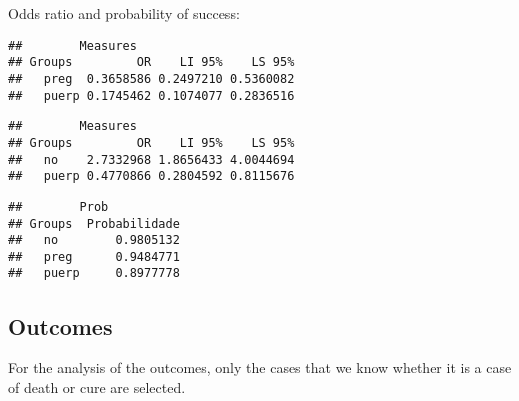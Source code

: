\documentclass[
]{article}
\newenvironment{Shaded}{\begin{snugshade}}{\end{snugshade}}
\newcommand{\CommentTok}[1]{\textcolor[rgb]{0.56,0.35,0.01}{\textit{#1}}}
\newcommand{\KeywordTok}[1]{\textcolor[rgb]{0.13,0.29,0.53}{\textbf{#1}}}
\newcommand{\NormalTok}[1]{#1}
\newcommand{\OperatorTok}[1]{\textcolor[rgb]{0.81,0.36,0.00}{\textbf{#1}}}
\begin{document}
Odds ratio and probability of success:

\begin{Shaded}
\end{Shaded}

\begin{verbatim}
##        Measures
## Groups         OR    LI 95%    LS 95%
##   preg  0.3658586 0.2497210 0.5360082
##   puerp 0.1745462 0.1074077 0.2836516
\end{verbatim}

\begin{Shaded}
\end{Shaded}

\begin{verbatim}
##        Measures
## Groups         OR    LI 95%    LS 95%
##   no    2.7332968 1.8656433 4.0044694
##   puerp 0.4770866 0.2804592 0.8115676
\end{verbatim}

\begin{Shaded}
\end{Shaded}

\begin{verbatim}
##        Prob
## Groups  Probabilidade
##   no        0.9805132
##   preg      0.9484771
##   puerp     0.8977778
\end{verbatim}

\hypertarget{outcomes}{%
\subsection{Outcomes}\label{outcomes}}

For the analysis of the outcomes, only the cases that we know whether it
is a case of death or cure are selected.
\end{document}
